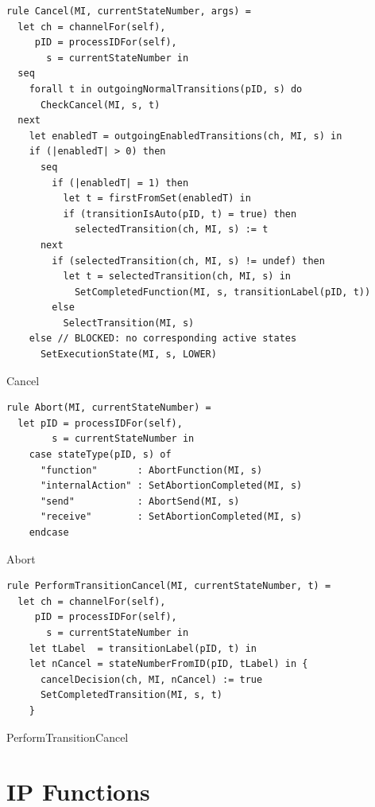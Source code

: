 \begin{listing}[H]
\begin{verbatim}
rule Cancel(MI, currentStateNumber, args) =
  let ch = channelFor(self),
     pID = processIDFor(self),
       s = currentStateNumber in
  seq
    forall t in outgoingNormalTransitions(pID, s) do
      CheckCancel(MI, s, t)
  next
    let enabledT = outgoingEnabledTransitions(ch, MI, s) in
    if (|enabledT| > 0) then
      seq
        if (|enabledT| = 1) then
          let t = firstFromSet(enabledT) in
          if (transitionIsAuto(pID, t) = true) then
            selectedTransition(ch, MI, s) := t
      next
        if (selectedTransition(ch, MI, s) != undef) then
          let t = selectedTransition(ch, MI, s) in
            SetCompletedFunction(MI, s, transitionLabel(pID, t))
        else
          SelectTransition(MI, s)
    else // BLOCKED: no corresponding active states
      SetExecutionState(MI, s, LOWER)
\end{verbatim}
\caption{Cancel}
\label{lst:asm:Cancel}
\end{listing}


\begin{listing}[H]
\begin{verbatim}
rule Abort(MI, currentStateNumber) =
  let pID = processIDFor(self),
        s = currentStateNumber in
    case stateType(pID, s) of
      "function"       : AbortFunction(MI, s)
      "internalAction" : SetAbortionCompleted(MI, s)
      "send"           : AbortSend(MI, s)
      "receive"        : SetAbortionCompleted(MI, s)
    endcase
\end{verbatim}
\caption{Abort}
\label{lst:asm:Abort}
\end{listing}


\begin{listing}[H]
\begin{verbatim}
rule PerformTransitionCancel(MI, currentStateNumber, t) =
  let ch = channelFor(self),
     pID = processIDFor(self),
       s = currentStateNumber in
    let tLabel  = transitionLabel(pID, t) in
    let nCancel = stateNumberFromID(pID, tLabel) in {
      cancelDecision(ch, MI, nCancel) := true
      SetCompletedTransition(MI, s, t)
    }
\end{verbatim}
\caption{PerformTransitionCancel}
\label{lst:asm:PerformTransitionCancel}
\end{listing}



\section{IP Functions}



